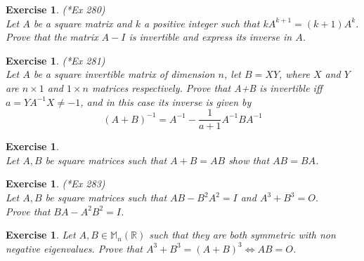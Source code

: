 \documentclass[12pt]{article}
\theoremstyle{definition}
\theoremstyle{remark}
\theoremstyle{plain}
\newtheorem{ex}[subsubsection]{Exercise}
\begin{document}
\begin{ex}\textup{(\cite{GA17}*{Ex 280})}\\
	Let $A$ be a square matrix and $ k $ a positive integer such that $ kA^{k+1}=(k+1)A^k $. Prove that the matrix $ A-I $ is invertible and express its inverse in $A$.
\end{ex}
\begin{ex}\textup{(\cite{GA17}*{Ex 281})}\\
	Let $ A $ be a square invertible matrix of dimension $n$, let $ B=XY $, where $X$ and $Y$ are $n\times 1$ and $1\times n$ matrices respectively. Prove that A+B is invertible iff $a=YA^{-1}X\neq -1$, and in this case its inverse is given by $$(A+B)^{-1}=A^{-1}-\frac{1}{a+1}A^{-1}BA^{-1}$$
\end{ex}
\begin{ex}\leavevmode \\
    Let $A,B$ be square matrices such that $A+B=AB$ show that $AB=BA$.
\end{ex}
\begin{ex}\textup{(\cite{GA17}*{Ex 283})}\\
Let $A,B$ be square matrices such that $ AB-B^2A^2=I $ and $ A^3+B^3=O $. \\Prove that $ BA-A^2B^2=I $.
\end{ex}
\begin{ex}
    Let $A,B\in \mathbb{M}_n(\mathbb{R})$ such that they are both symmetric with non negative eigenvalues. Prove that $A^3+B^3=(A+B)^3\iff AB=O$.
\end{ex}
\newpage
\end{document}

